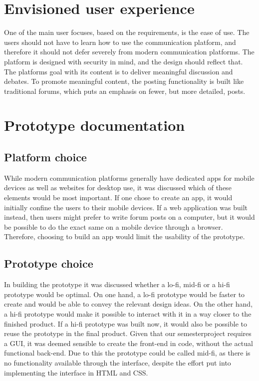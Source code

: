 \section{Envisioned user experience}
One of the main user focuses, based on the requirements, is the ease of use. The users should not have to learn how to use the communication platform, and therefore it should not defer severely from modern communication platforms. The platform is designed with security in mind, and the design should reflect that. The platforms goal with its content is to deliver meaningful discussion and debates. To promote meaningful content, the posting functionality is built like traditional forums, which puts an emphasis on fewer, but more detailed, posts.  

\section{Prototype documentation}
\subsection{Platform choice}
While modern communication platforms generally have dedicated apps for mobile devices as well as websites for desktop use, it was discussed which of these elements would be most important. If one chose to create an app, it would initially confine the users to their mobile devices. If a web application was built instead, then users might prefer to write forum posts on a computer, but it would be possible to do the exact same on a mobile device through a browser. Therefore, choosing to build an app would limit the usability of the prototype.

\subsection{Prototype choice}
In building the prototype it was discussed whether a lo-fi, mid-fi or a hi-fi prototype would be optimal. On one hand, a lo-fi prototype would be faster to create and would be able to convey the relevant design ideas. On the other hand, a hi-fi prototype would make it possible to interact with it in a way closer to the finished product. If a hi-fi prototype was built now, it would also be possible to reuse the prototype in the final product. Given that our semesterproject requires a GUI, it was deemed sensible to create the front-end in code, without the actual functional back-end. Due to this the prototype could be called mid-fi, as there is no functionality available through the interface, despite the effort put into implementing the interface in HTML and CSS.
\newpage

